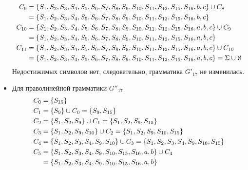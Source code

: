 \begin{itemize}
\begin{align*}
		      C_{9}  & = \left\{S_1, S_2, S_3, S_4, S_5, S_6, S_7, S_8, S_9, S_{10}, S_{11}, S_{12}, S_{15}, S_{16}, b, c\right\} \cup C_{8}              \\
		             & = \left\{S_1, S_2, S_3, S_4, S_5, S_6, S_7, S_8, S_9, S_{10}, S_{11}, S_{12}, S_{15}, S_{16}, b, c\right\}                         \\
		      C_{10} & = \left\{S_1, S_2, S_3, S_4, S_5, S_6, S_7, S_8, S_9, S_{10}, S_{11}, S_{12}, S_{15}, S_{16}, a, b, c\right\} \cup C_{9}           \\
		             & = \left\{S_1, S_2, S_3, S_4, S_5, S_6, S_7, S_8, S_9, S_{10}, S_{11}, S_{12}, S_{15}, S_{16}, a, b, c\right\}                      \\
		      C_{11} & = \left\{S_1, S_2, S_3, S_4, S_5, S_6, S_7, S_8, S_9, S_{10}, S_{11}, S_{12}, S_{15}, S_{16}, a, b, c\right\} \cup C_{10}          \\
		             & = \left\{S_1, S_2, S_3, S_4, S_5, S_6, S_7, S_8, S_9, S_{10}, S_{11}, S_{12}, S_{15}, S_{16}, a, b, c\right\} = \Sigma \cup \aleph
	      \end{align*}
	      Недостижимых символов нет, следовательно, грамматика \(G'_{17}\) не изменилась.
	\item Для праволинейной грамматики \(G''_{17}\)
	      \begin{align*}
		      C_{0}  & = \cbr{S_{15}}                                                                                                            \\
		      C_{1}  & = \cbr{S_9} \cup C_{0} = \cbr{S_9, S_{15}}                                                                                \\
		      C_{2}  & = \cbr{S_1, S_2, S_9} \cup C_{1} = \cbr{S_1, S_2, S_9, S_{15}}                                                            \\
		      C_{3}  & = \cbr{S_1, S_2, S_9, S_{10}} \cup C_{2} = \cbr{S_1, S_2, S_9, S_{10}, S_{15}}                                            \\
		      C_{4}  & = \cbr{S_1, S_2, S_3, S_4, S_9, S_{10}} \cup C_{3} = \cbr{S_1, S_2, S_3, S_4, S_9, S_{10}, S_{15}}                        \\
		      C_{5}  & = \cbr{S_1, S_2, S_3, S_4, S_9, S_{10}, S_{15}, S_{16}, a, b} \cup C_{4}                                                  \\
		             & = \cbr{S_1, S_2, S_3, S_4, S_9, S_{10}, S_{15}, S_{16}, a, b}                                                             \\

\end{align*}
\end{itemize}
